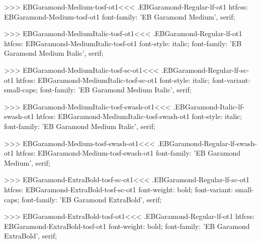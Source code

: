 {{{{{{{>>>
\<EBGaramond-Medium-tosf-ot1\><<<
.EBGaramond-Regular-lf-ot1
htfcss:  EBGaramond-Medium-tosf-ot1  font-family: 'EB Garamond Medium', serif;

>>>
\<EBGaramond-MediumItalic-tosf-ot1\><<<
.EBGaramond-Regular-lf-ot1
htfcss:  EBGaramond-MediumItalic-tosf-ot1  font-style: italic; font-family: 'EB Garamond Medium Italic', serif;

>>>
\<EBGaramond-MediumItalic-tosf-sc-ot1\><<<
.EBGaramond-Regular-lf-sc-ot1
htfcss:  EBGaramond-MediumItalic-tosf-sc-ot1  font-style: italic; font-variant: small-caps; font-family: 'EB Garamond Medium Italic', serif;

>>>
\<EBGaramond-MediumItalic-tosf-swash-ot1\><<<
.EBGaramond-Italic-lf-swash-ot1
htfcss:  EBGaramond-MediumItalic-tosf-swash-ot1  font-style: italic; font-family: 'EB Garamond Medium Italic', serif;

>>>
\<EBGaramond-Medium-tosf-swash-ot1\><<<
.EBGaramond-Regular-lf-swash-ot1
htfcss:  EBGaramond-Medium-tosf-swash-ot1  font-family: 'EB Garamond Medium', serif;

>>>
\<EBGaramond-ExtraBold-tosf-sc-ot1\><<<
.EBGaramond-Regular-lf-sc-ot1
htfcss:  EBGaramond-ExtraBold-tosf-sc-ot1  font-weight: bold; font-variant: small-caps; font-family: 'EB Garamond ExtraBold', serif;

>>>
\<EBGaramond-ExtraBold-tosf-ot1\><<<
.EBGaramond-Regular-lf-ot1
htfcss:  EBGaramond-ExtraBold-tosf-ot1  font-weight: bold; font-family: 'EB Garamond ExtraBold', serif;

}}}}}}}
